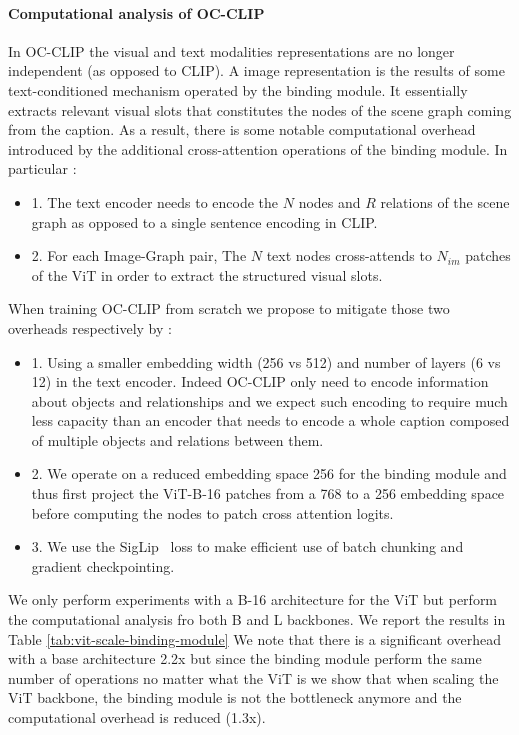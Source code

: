 {\paragraph{Computational analysis of OC-CLIP} In OC-CLIP the visual and text modalities representations are no longer independent (as opposed to CLIP). A image representation is the results of some text-conditioned mechanism operated by the binding module. It essentially extracts relevant visual slots that constitutes the nodes of the scene graph coming from the caption. As a result, there is some notable computational overhead introduced by the additional cross-attention operations of the binding module. In particular : \begin{itemize}
    \item  1. The text encoder needs to encode the $N$ nodes and $R$ relations of the scene graph as opposed to a single sentence encoding in CLIP.
    \item 2. For each Image-Graph pair, The $N$ text nodes cross-attends to $N_{im}$ patches of the ViT in order to extract the structured visual slots.
\end{itemize}
When training OC-CLIP from scratch we propose to mitigate those two overheads respectively by : 
\begin{itemize}
    \item 1. Using a smaller embedding width (256 vs 512) and number of layers (6 vs 12) in the text encoder. Indeed OC-CLIP only need to encode information about objects and relationships and we expect such encoding to require much less capacity than an encoder that needs to encode a whole caption composed of multiple objects and relations between them.
    \item 2. We operate on a reduced embedding space 256 for the binding module and thus first project the ViT-B-16 patches from a 768 to a 256 embedding space before computing the nodes to patch cross attention logits.
    \item 3. We use the SigLip~\citep{zhai2023sigmoidlosslanguageimage} loss to make efficient use of batch chunking and gradient checkpointing.
\end{itemize}
We only perform experiments with a B-16 architecture for the ViT but perform the computational analysis fro both B and L backbones. We report the results in Table \ref{tab:vit-scale-binding-module} We note that there is  a significant overhead with a base architecture 2.2x but since the binding module perform the same number of operations no matter what the ViT is we show that when scaling the ViT backbone, the binding module is not the bottleneck anymore and the computational overhead is reduced (1.3x).
}
